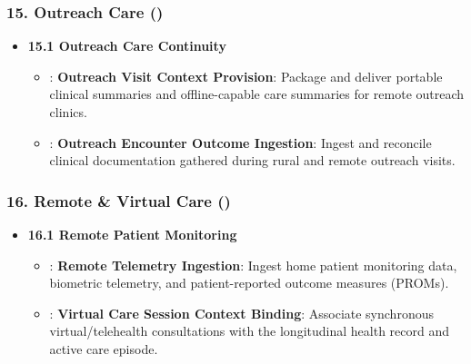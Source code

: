 \subsubsection*{15. Outreach Care (\texttt{})}
\label{rad:enabling:430}

\begin{itemize}

\item 
\textbf{15.1 Outreach Care Continuity}


\begin{itemize}

\item 
\texttt{}: \textbf{Outreach Visit Context Provision}: Package and deliver portable clinical summaries and offline-capable care summaries for remote outreach clinics.



\item 
\texttt{}: \textbf{Outreach Encounter Outcome Ingestion}: Ingest and reconcile clinical documentation gathered during rural and remote outreach visits.



\end{itemize}


\end{itemize}
\label{rad:enabling:434}
\subsubsection*{16. Remote \& Virtual Care (\texttt{})}
\label{rad:enabling:435}

\begin{itemize}

\item 
\textbf{16.1 Remote Patient Monitoring}


\begin{itemize}

\item 
\texttt{}: \textbf{Remote Telemetry Ingestion}: Ingest home patient monitoring data, biometric telemetry, and patient-reported outcome measures (PROMs).



\item 
\texttt{}: \textbf{Virtual Care Session Context Binding}: Associate synchronous virtual/\allowbreak{}telehealth consultations with the longitudinal health record and active care episode.



\end{itemize}


\end{itemize}
\label{rad:enabling:439}

